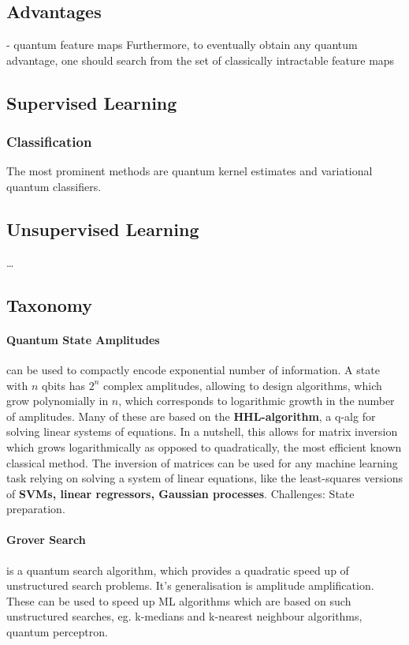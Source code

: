 \subsection{Advantages}
- quantum feature maps
Furthermore, to eventually obtain any quantum advantage, 
one should search from the set of classically intractable feature maps

\subsection{Supervised Learning}
\subsubsection{Classification}
The most prominent methods are quantum kernel estimates and variational quantum
classifiers.

\subsection{Unsupervised Learning}
\dots

\subsection{Taxonomy}

\paragraph{Quantum State Amplitudes} can be used to compactly encode exponential
number of information. A state with $n$ qbits has $2^n$ complex amplitudes,
allowing to design algorithms, which grow polynomially in $n$, which corresponds
to logarithmic growth in the number of amplitudes. Many of these are based on
the \textbf{HHL-algorithm}, a q-alg for solving linear systems of equations. In
a nutshell, this allows for matrix inversion which grows logarithmically as
opposed to quadratically, the most efficient known classical method. The
inversion of matrices can be used for any machine learning task relying on
solving a system of linear equations, like the least-squares versions of
\textbf{SVMs, linear regressors, Gaussian processes}. Challenges: State
preparation.

\paragraph{Grover Search} is a quantum search algorithm, which provides a
quadratic speed up of unstructured search problems. It's generalisation is
amplitude amplification. These can be used to speed up ML algorithms which are
based on such unstructured searches, eg. k-medians and k-nearest neighbour
algorithms, quantum perceptron.

